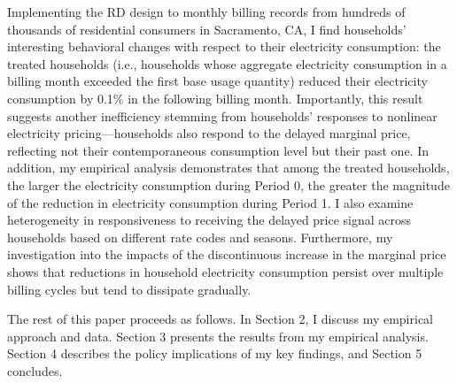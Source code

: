 Implementing the RD design to monthly billing records from hundreds of thousands of residential consumers in Sacramento, CA, I find households' interesting behavioral changes with respect to their electricity consumption: the treated households (i.e., households whose aggregate electricity consumption in a billing month exceeded the first base usage quantity) reduced their electricity consumption by 0.1\% in the following billing month. Importantly, this result suggests another inefficiency stemming from households' responses to nonlinear electricity pricing---households also respond to the delayed marginal price, reflecting not their contemporaneous consumption level but their past one. In addition, my empirical analysis demonstrates that among the treated households, the larger the electricity consumption during Period 0, the greater the magnitude of the reduction in electricity consumption during Period 1. I also examine heterogeneity in responsiveness to receiving the delayed price signal across households based on different rate codes and seasons. Furthermore, my investigation into the impacts of the discontinuous increase in the marginal price shows that reductions in household electricity consumption persist over multiple billing cycles but tend to dissipate gradually. 

The rest of this paper proceeds as follows. In Section 2, I discuss my empirical approach and data. Section 3 presents the results from my empirical analysis. Section 4 describes the policy implications of my key findings, and Section 5 concludes. 